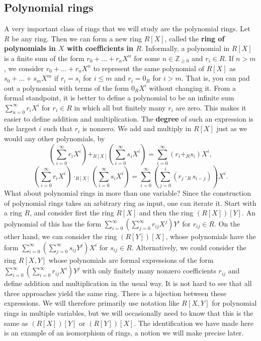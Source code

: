 \documentclass{article}
\newcommand{\Z}{\mathbb{Z}}
\newcommand{\rb}[1]{\left( #1 \right)}
\renewcommand{\sb}[1]{\left[ #1 \right]}
\theoremstyle{definition}\newtheorem{definition}{Definition}[section]
\theoremstyle{definition}\newtheorem{remark}[definition]{Remark}
\theoremstyle{definition}\newtheorem*{example}{Example}
\theoremstyle{definition}\newtheorem*{note}{Note}
\begin{document}

\subsection{Polynomial rings}

A very important class of rings that we will study are the polynomial rings. Let $ R $ be any ring. Then we can form a new ring $ R\sb{X} $, called the \textbf{ring of polynomials in $ X $ with coefficients in $ R $}. Informally, a polynomial in $ R\sb{X} $ is a finite sum of the form $ r_0 + \dots + r_nX^n $ for some $ n \in \Z_{\ge 0} $ and $ r_i \in R $. If $ n > m $, we consider $ r_0 + \dots + r_nX^n $ to represent the same polynomial of $ R\sb{X} $ as $ s_0 + \dots + s_mX^m $ if $ r_i = s_i $ for $ i \le m $ and $ r_i = 0_R $ for $ i > m $. That is, you can pad out a polynomial with terms of the form $ 0_RX^i $ without changing it. From a formal standpoint, it is better to define a polynomial to be an infinite sum $ \sum_{n = 0}^\infty r_iX^i $ for $ r_i \in R $ in which all but finitely many $ r_i $ are zero. This makes it easier to define addition and multiplication. The \textbf{degree} of such an expression is the largest $ i $ such that $ r_i $ is nonzero. We add and multiply in $ R\sb{X} $ just as we would any other polynomials, by
$$ \rb{\sum_{i = 0}^\infty r_iX^i} +_{R\sb{X}} \rb{\sum_{i = 0}^\infty s_iX^i} = \sum_{i = 0}^\infty \rb{r_i +_R s_i} X^i, $$
$$ \rb{\sum_{i = 0}^\infty r_iX^i} \cdot_{R\sb{X}} \rb{\sum_{i = 0}^\infty s_iX^i} = \sum_{i = 0}^\infty \rb{\sum_{j = 0}^i \rb{r_j \cdot_R s_{i - j}}} X^i. $$
What about polynomial rings in more than one variable? Since the construction of polynomial rings takes an arbitrary ring as input, one can iterate it. Start with a ring $ R $, and consider first the ring $ R\sb{X} $ and then the ring $ \rb{R\sb{X}}\sb{Y} $. An polynomial of this has the form $ \sum_{i = 0}^\infty \rb{\sum_{j = 0}^\infty r_{ij}X^j}Y^i $ for $ r_{ij} \in R $. On the other hand, we can consider the ring $ \rb{R\sb{Y}}\sb{X} $, whose polynomials have the form $ \sum_{i = 0}^\infty \rb{\sum_{j = 0}^\infty s_{ij}Y^j}X^i $ for $ s_{ij} \in R $. Alternatively, we could consider the ring $ R\sb{X, Y} $ whose polynomials are formal expressions of the form $ \sum_{i = 0}^\infty \rb{\sum_{i = 0}^\infty r_{ij}X^i}Y^j $ with only finitely many nonzero coefficients $ r_{ij} $ and define addition and multiplication in the usual way. It is not hard to see that all three approaches yield the same ring. There is a bijection between these expressions. We will therefore primarily use notation like $ R\sb{X, Y} $ for polynomial rings in multiple variables, but we will occasionally need to know that this is the same as $ \rb{R\sb{X}}\sb{Y} $ or $ \rb{R\sb{Y}}\sb{X} $. The identification we have made here is an example of an isomorphism of rings, a notion we will make precise later.
\end{document}
